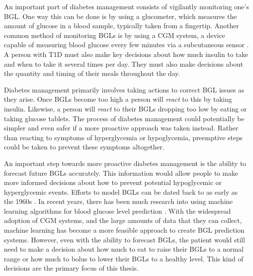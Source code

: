 An important part of diabetes management consists of vigilantly monitoring one's \ac{BGL}. One way this can be done is by using a glucometer, which measures the amount of glucose in a blood sample, typically taken from a fingertip. Another common method of monitoring \ac{BGLs} is by using a \ac{CGM} system, a device capable of measuring blood glucose every few minutes via a subcutaneous sensor \cite{CDC:managing}. A person with \ac{T1D} must also make key decisions about how much insulin to take and when to take it several times per day. They must also make decisions about the quantity and timing of their meals throughout the day.

Diabetes management primarily involves taking actions to correct \ac{BGL} issues as they arise. Once \ac{BGLs} become too high a person will \emph{react} to this by taking insulin. Likewise, a person will \emph{react} to their \ac{BGLs} dropping too low by eating or taking glucose tablets. The process of diabetes management could potentially be simpler and even safer if a more proactive approach was taken instead. Rather than reacting to symptoms of hyperglycemia or hypoglycemia, preemptive steps could be taken to prevent these symptoms altogether.

An important step towards more proactive diabetes management is the ability to forecast future \ac{BGLs} accurately. This information would allow people to make more informed decisions about how to prevent potential hypoglycemic or hyperglycemic events. Efforts to model \ac{BGLs} can be dated back to as early as the 1960s \cite{boutayeb2016}. In recent years, there has been much research into using machine learning algorithms for blood glucose level prediction \cite{plis:maiha14, rubin_falcone:nbeats_bgl, mirshekarian:bgl_pred, bunescu:svr_bgl}. With the widespread adoption of \ac{CGM} systems, and the large amounts of data that they can collect, machine learning has become a more feasible approach to create \ac{BGL} prediction systems. However, even with the ability to forecast \ac{BGLs}, the patient would still need to make a decision about how much to eat to raise their \ac{BGLs} to a normal range or how much to bolus to lower their \ac{BGLs} to a healthy level. This kind of decisions are the primary focus of this thesis.


